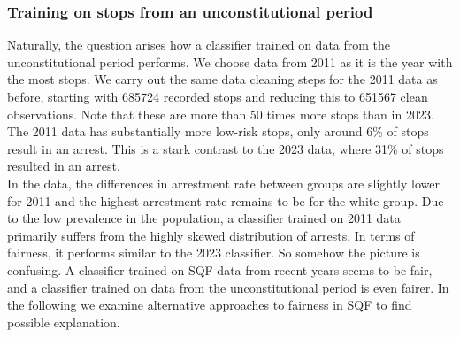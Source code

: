 \subsubsection*{Training on stops from an unconstitutional period}
Naturally, the question arises how a classifier trained on data from the unconstitutional period performs.
We choose data from 2011 as it is the year with the most stops. We carry out the same data cleaning steps for the 2011 data as before, starting with 685724 recorded stops and reducing this to 651567 clean observations. Note that these are more than 50 times more stops than in 2023.
The 2011 data has substantially more low-risk stops, only around 6\% of stops result in an arrest. This is a stark contrast to the 2023 data, where 31\% of stops resulted in an arrest.\\
In the data, the differences in arrestment rate between groups are slightly lower for 2011 and the highest arrestment rate remains to be for the white group.
Due to the low prevalence in the population, a classifier trained on 2011 data primarily suffers from the highly skewed distribution of arrests. In terms of fairness, it performs similar to the 2023 classifier.
So somehow the picture is confusing. A classifier trained on SQF data from recent years seems to be fair, and a classifier trained on data from the unconstitutional period is even fairer. In the following we examine alternative approaches to fairness in SQF to find possible explanation.




